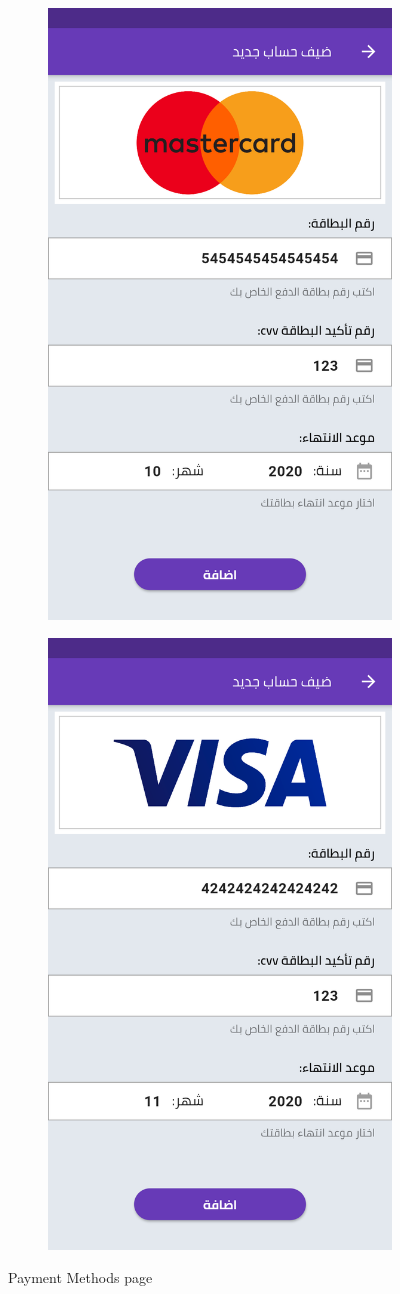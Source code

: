         \begin{figure}[H] 

    \begin{subfigure}[b]{0.5\linewidth}
    \centering
    \includegraphics[width=0.5\linewidth]{images/ch3/payment/Adding Payment Method/5.png}
  
  \end{subfigure}%
   \begin{subfigure}[b]{0.5\linewidth}
    \centering
    \includegraphics[width=0.5\linewidth]{images/ch3/payment/Adding Payment Method/2.png}
  
  \end{subfigure}%
\caption{Payment Methods page}
  \end{figure}
